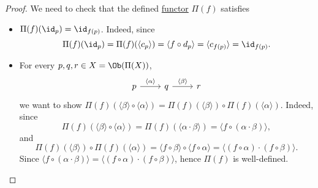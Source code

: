 \begin{proof}
	We need to check that the defined \hyperref[def:functor]{functor} \(\Pi (f)\) satisfies
	\begin{itemize}
		\item \(\Pi (f)(\id_{p} ) = \id_{f(p)} \). Indeed, since
		      \[
			      \Pi (f)(\id_{p} ) = \Pi (f)(\langle c_p \rangle ) = \langle f\circ d_{p}  \rangle = \langle c_{f(p)} \rangle = \id_{f(p)}.
		      \]
		\item For every \(p, q, r\in X = \Ob (\Pi (X))\),
		      \[
			      \begin{tikzcd}
				      {p} & {q} & {r}
				      \arrow["\langle \alpha  \rangle ", from=1-1, to=1-2]
				      \arrow["\langle \beta  \rangle ", from=1-2, to=1-3]
			      \end{tikzcd}
		      \]
		      we want to show \(\Pi (f)\left(\langle \beta  \rangle \circ \langle \alpha  \rangle \right) = \Pi (f)(\langle \beta  \rangle )\circ \Pi (f)(\langle \alpha  \rangle )\). Indeed, since
		      \[
			      \Pi (f)\left(\langle \beta  \rangle \circ \langle \alpha  \rangle \right) = \Pi (f)(\langle \alpha \cdot \beta  \rangle ) = \langle f\circ (\alpha \cdot \beta ) \rangle,
		      \]
		      and
		      \[
			      \Pi (f)(\langle \beta  \rangle )\circ \Pi (f)(\langle \alpha  \rangle ) = \langle f\circ \beta  \rangle \circ \langle f\circ \alpha  \rangle = \langle (f\circ \alpha )\cdot (f\circ \beta ) \rangle.
		      \]
		      Since \( \langle f\circ (\alpha \cdot \beta ) \rangle = \langle (f\circ \alpha )\cdot (f\circ \beta ) \rangle\), hence \(\Pi (f)\) is well-defined.
	\end{itemize}


\end{proof}
